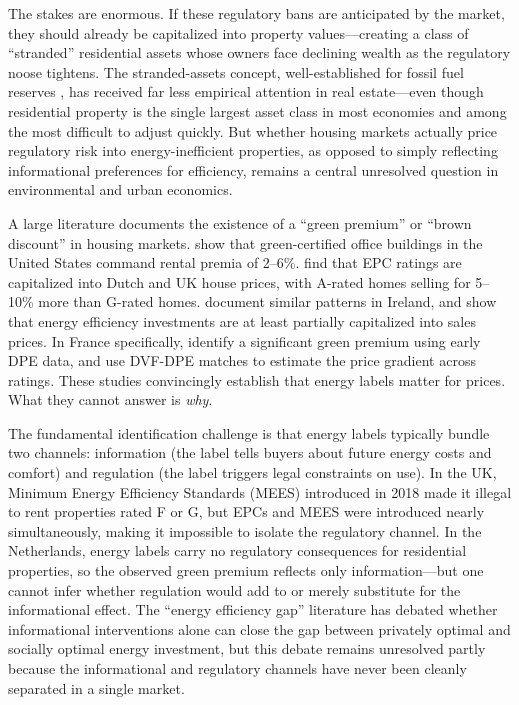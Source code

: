 \documentclass[12pt]{article}
\begin{document}
The stakes are enormous. If these regulatory bans are anticipated by the market, they should already be capitalized into property values---creating a class of ``stranded'' residential assets whose owners face declining wealth as the regulatory noose tightens. The stranded-assets concept, well-established for fossil fuel reserves \citep{sallee2024stranded}, has received far less empirical attention in real estate---even though residential property is the single largest asset class in most economies and among the most difficult to adjust quickly. But whether housing markets actually price regulatory risk into energy-inefficient properties, as opposed to simply reflecting informational preferences for efficiency, remains a central unresolved question in environmental and urban economics.

A large literature documents the existence of a ``green premium'' or ``brown discount'' in housing markets. \citet{eichholtz2010doing} show that green-certified office buildings in the United States command rental premia of 2--6\%. \citet{brounen2013energy} find that EPC ratings are capitalized into Dutch and UK house prices, with A-rated homes selling for 5--10\% more than G-rated homes. \citet{hyland2013value} document similar patterns in Ireland, and \citet{aydin2020capitalization} show that energy efficiency investments are at least partially capitalized into sales prices. In France specifically, \citet{dequiedt2018greenium} identify a significant green premium using early DPE data, and \citet{pommeranz2024green} use DVF-DPE matches to estimate the price gradient across ratings. These studies convincingly establish that energy labels matter for prices. What they cannot answer is \textit{why}.

The fundamental identification challenge is that energy labels typically bundle two channels: information (the label tells buyers about future energy costs and comfort) and regulation (the label triggers legal constraints on use). In the UK, Minimum Energy Efficiency Standards (MEES) introduced in 2018 made it illegal to rent properties rated F or G, but EPCs and MEES were introduced nearly simultaneously, making it impossible to isolate the regulatory channel. In the Netherlands, energy labels carry no regulatory consequences for residential properties, so the observed green premium reflects only information---but one cannot infer whether regulation would add to or merely substitute for the informational effect. The ``energy efficiency gap'' literature \citep{allcott2014information, gerarden2017assessing} has debated whether informational interventions alone can close the gap between privately optimal and socially optimal energy investment, but this debate remains unresolved partly because the informational and regulatory channels have never been cleanly separated in a single market.
\end{document}
